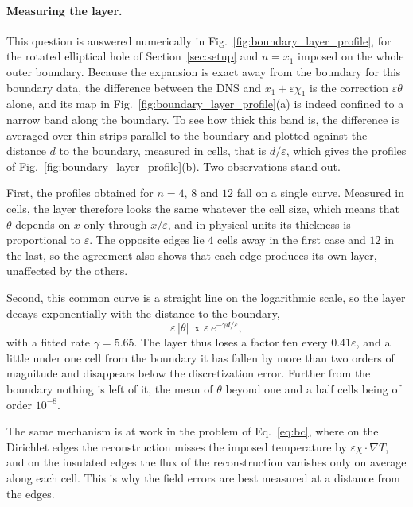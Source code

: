 \documentclass{article}
\begin{document}
\paragraph{Measuring the layer.} This question is answered numerically in
Fig.~\ref{fig:boundary_layer_profile}, for the rotated elliptical hole of
Section~\ref{sec:setup} and $u = x_1$ imposed on the whole outer boundary. Because the
expansion is exact away from the boundary for this boundary data, the difference between
the DNS and $x_1 + \varepsilon \chi_1$ is the correction $\varepsilon \theta$ alone, and
its map in Fig.~\ref{fig:boundary_layer_profile}(a) is indeed confined to a narrow band
along the boundary. To see how thick this band is, the difference is averaged over thin
strips parallel to the boundary and plotted against the distance $d$ to the boundary,
measured in cells, that is $d / \varepsilon$, which gives the profiles of
Fig.~\ref{fig:boundary_layer_profile}(b). Two observations stand out.

First, the profiles obtained for $n = 4$, $8$ and $12$ fall on a single curve. Measured in
cells, the layer therefore looks the same whatever the cell size, which means that
$\theta$ depends on $x$ only through $x / \varepsilon$, and in physical units its
thickness is proportional to $\varepsilon$. The opposite edges lie $4$ cells away in the
first case and $12$ in the last, so the agreement also shows that each edge produces its
own layer, unaffected by the others.

Second, this common curve is a straight line on the logarithmic scale, so the layer
decays exponentially with the distance to the boundary,
\begin{equation}
  \label{eq:layer_decay}
  \varepsilon \, | \theta | \propto \varepsilon \, e^{- \gamma d / \varepsilon},
\end{equation}
with a fitted rate $\gamma = 5.65$. The layer thus loses a factor ten every
$0.41 \varepsilon$, and a little under one cell from the boundary it has fallen by more
than two orders of magnitude and disappears below the discretization error. Further from
the boundary nothing is left of it, the mean of $\theta$ beyond one and a half cells being
of order $10^{-8}$.

The same mechanism is at work in the problem of Eq.~\eqref{eq:bc}, where on the Dirichlet
edges the reconstruction misses the imposed temperature by
$\varepsilon \chi \cdot \nabla T$, and on the insulated edges the flux of the
reconstruction vanishes only on average along each cell. This is why the field
errors are best measured at a distance from the edges.
\end{document}
